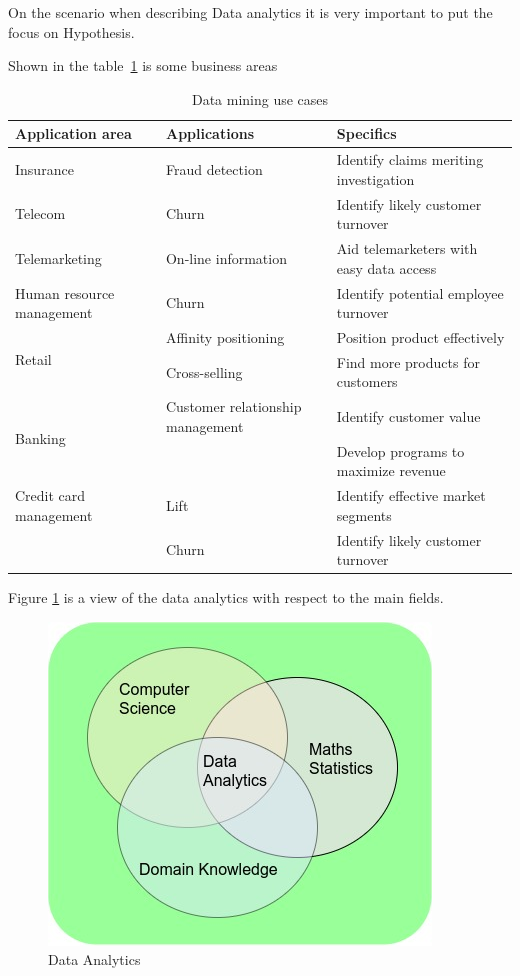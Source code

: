 On the scenario when describing Data analytics it is very important to put the focus on Hypothesis.

Shown in the table~\ref{tableDMusecase} is some business areas 


\begin{table}[H]
	\centering
	\begin{tabular}{|p{4cm}|p{4cm}|l|}
		\hline
		\textbf{Application area} & \textbf{Applications} & \textbf{Specifics}\\
		\hline
		Insurance & Fraud detection & Identify claims meriting investigation\\
		\hline
		Telecom & Churn & Identify likely customer turnover\\
		\hline
		Telemarketing & On-line information & Aid telemarketers with easy data access\\
		\hline
		Human resource management & Churn & Identify potential employee turnover\\
		\hline
		\multirow{2}{4em}{Retail}  & Affinity positioning & Position product effectively\\
		& Cross-selling & Find more products for customers\\
		\hline
		\multirow{2}{4em}{Banking} & Customer relationship management & Identify customer value\\
		&& Develop programs to maximize revenue\\
		\hline
		Credit card management & Lift & Identify effective market segments\\
		& Churn & Identify likely customer turnover\\
		\hline
	\end{tabular}
	\caption{Data mining use cases}
	\label{tableDMusecase}
\end{table}
	
Figure \ref{fig:data-analytics} is a view of the data analytics with respect to the main fields.

\begin{figure}[H]
	\includegraphics[scale = 0.8]{figures/FlowChart.jpg}
	\centering
	\caption{Data Analytics}
	\label{fig:data-analytics}
\end{figure}
\FloatBarrier


